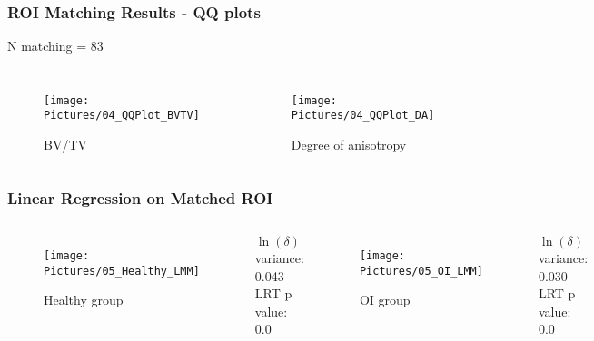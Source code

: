 \documentclass[xcolor=table]{beamer}
\begin{document}
\begin{frame}
	\frametitle{ROI Matching Results - QQ plots}
	N matching = 83
	\begin{columns}
		\centering
		\begin{figure}
			\texttt{[image: Pictures/04\_QQPlot\_BVTV]}
			\caption{BV/TV}
		\end{figure}
		\centering
		\begin{figure}
			\texttt{[image: Pictures/04\_QQPlot\_DA]}
			\caption{Degree of anisotropy}
		\end{figure}
	\end{columns}
\end{frame}



\begin{frame}
	\frametitle{Linear Regression on Matched ROI}
	\begin{columns}
		\column[c]{0.45\linewidth}
		\centering
		\begin{figure}
			\texttt{[image: Pictures/05\_Healthy\_LMM]}
			\caption{Healthy group}
		\end{figure}
		$\ln(\delta)$ variance: 0.043\\
		LRT p value: 0.0
		\column[c]{0.45\linewidth}
		\centering
		\begin{figure}
			\texttt{[image: Pictures/05\_OI\_LMM]}
			\caption{OI group}
		\end{figure}
		$\ln(\delta)$ variance: 0.030\\
		LRT p value: 0.0
	\end{columns}
\end{frame}
\end{document}
